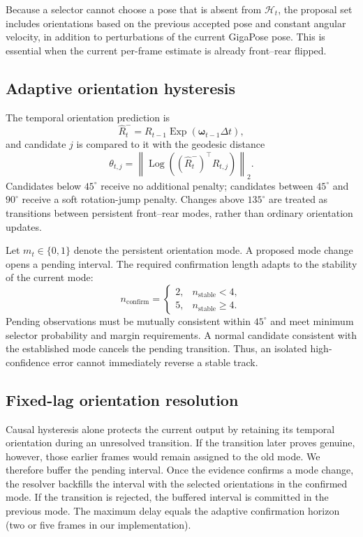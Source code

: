 \documentclass[10pt,twocolumn]{article}
\newcommand{\Exp}{\operatorname{Exp}}
\newcommand{\Log}{\operatorname{Log}}
\begin{document}
Because a selector cannot choose a pose that is absent from $\mathcal{H}_t$,
the proposal set includes orientations based on the previous accepted pose and
constant angular velocity, in addition to perturbations of the current
GigaPose pose. This is essential when the current per-frame estimate is already
front--rear flipped.

\subsection{Adaptive orientation hysteresis}
\label{sec:hysteresis}

The temporal orientation prediction is
\begin{equation}
\widehat{R}_{t}^{-}=R_{t-1}\Exp(\bm{\omega}_{t-1}\Delta t),
\end{equation}
and candidate $j$ is compared to it with the geodesic distance
\begin{equation}
\theta_{t,j}=
\left\|\Log\left((\widehat{R}_{t}^{-})^{\top}R_{t,j}\right)\right\|_2.
\end{equation}
Candidates below $45^\circ$ receive no additional penalty; candidates between
$45^\circ$ and $90^\circ$ receive a soft rotation-jump penalty. Changes above
$135^\circ$ are treated as transitions between persistent front--rear modes,
rather than ordinary orientation updates.

Let $m_t\in\{0,1\}$ denote the persistent orientation mode. A proposed mode
change opens a pending interval. The required confirmation length adapts to
the stability of the current mode:
\begin{equation}
n_{\mathrm{confirm}} =
\begin{cases}
2, & n_{\mathrm{stable}}<4,\\
5, & n_{\mathrm{stable}}\geq4.
\end{cases}
\end{equation}
Pending observations must be mutually consistent within $45^\circ$ and meet
minimum selector probability and margin requirements. A normal candidate
consistent with the established mode cancels the pending transition. Thus, an
isolated high-confidence error cannot immediately reverse a stable track.

\subsection{Fixed-lag orientation resolution}

Causal hysteresis alone protects the current output by retaining its temporal
orientation during an unresolved transition. If the transition later proves
genuine, however, those earlier frames would remain assigned to the old mode.
We therefore buffer the pending interval. Once the evidence confirms a mode
change, the resolver backfills the interval with the selected orientations in
the confirmed mode. If the transition is rejected, the buffered interval is
committed in the previous mode. The maximum delay equals the adaptive
confirmation horizon (two or five frames in our implementation).
\end{document}
